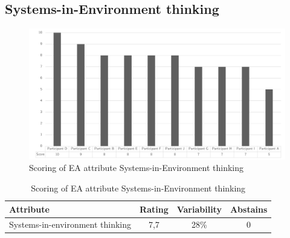 \subsection{Systems-in-Environment thinking}
\begin{figure}[h!]
	\centering
	\includegraphics[width=0.9\linewidth]{images/scoreeasystemsinenvironmentthinking}
	\caption[Scoring of EA attribute Systems-in-Environment thinking]{Scoring of EA attribute Systems-in-Environment thinking}
	\label{fig:appscoringeasystemsinenvironmentthinking}
\end{figure}
\begin{table}[h!]
	\centering
	\begin{tabular}{p{}ccc}
		\toprule
		\textbf{Attribute} & \textbf{Rating} & \textbf{Variability} & \textbf{Abstains} \\
		\midrule
		Systems-in-environment thinking & 7,7 & 28\% & 0 \\%
		\bottomrule
	\end{tabular}%
	\caption[Scoring of EA attribute Systems-in-Environment thinking]{Scoring of EA attribute Systems-in-Environment thinking}
	\label{tab:appscoringeasystemsinenvironmentthinking}%
\end{table}%
\newpage
